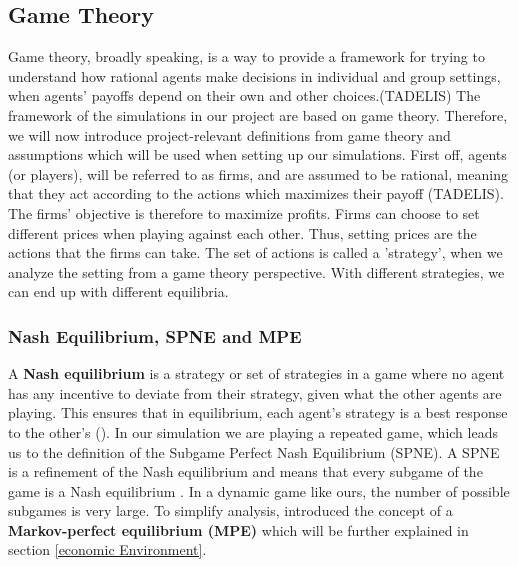 \documentclass{article}
\begin{document}
\subsection {Game Theory}
\label{GameTheory}
Game theory, broadly speaking, is a way to provide a framework for trying to understand how rational agents make decisions in individual and group settings, when agents' payoffs depend on their own and other choices.(TADELIS)
\newline
The framework of the simulations in our project are based on game theory. Therefore, we will now introduce project-relevant definitions from game theory and assumptions which will be used when setting up our simulations.
\newline
First off, agents (or players), will be referred to as firms, and are assumed to be rational, meaning that they act according to the actions which maximizes their payoff (TADELIS). The firms' objective is therefore to maximize profits.
\newline
Firms can choose to set different prices when playing against each other. Thus, setting prices are the actions that the firms can take.
The set of actions is called a 'strategy', when we analyze the setting from a game theory perspective. With different strategies, we can end up with different equilibria.
\subsubsection{Nash Equilibrium, SPNE and MPE}
A \textbf{Nash equilibrium} is a strategy or set of strategies in a game where no agent has any incentive to deviate from their strategy, given what the other agents are playing. This ensures that in equilibrium, each agent's strategy is a best response to the other's (\cite{tadelis}).
\newline
In our simulation we are playing a repeated game, which leads us to the definition of the Subgame Perfect Nash Equilibrium (SPNE). A SPNE is a refinement of the Nash equilibrium and means that every subgame of the game is a Nash equilibrium \citep[p. 157]{tadelis}. 
\newline
In a dynamic game like ours, the number of possible subgames is very large. To simplify analysis, \cite{MaskinTirole} introduced the concept of a \textbf{Markov-perfect equilibrium (MPE)} which will be further explained in section \ref{economic Environment}. 
\end{document}
